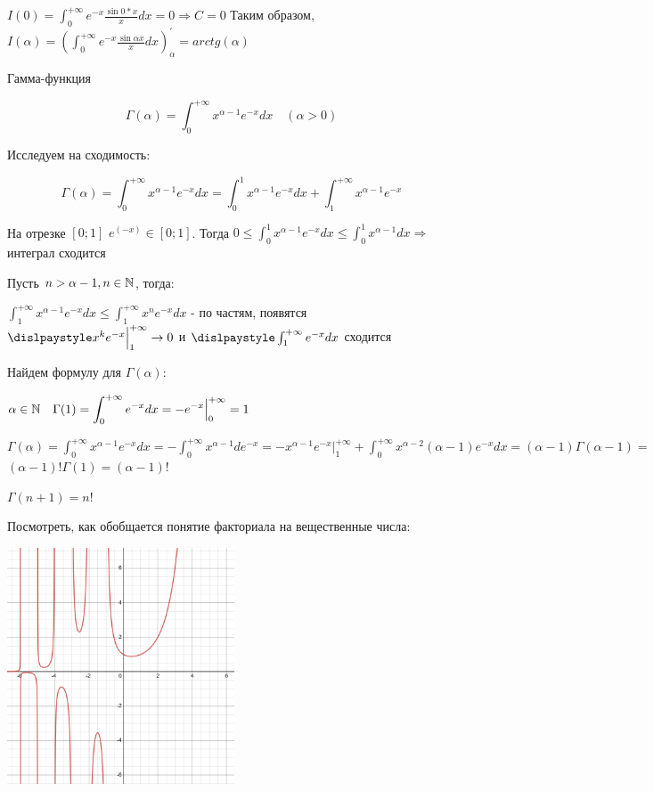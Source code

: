 \documentclass[12pt]{article}
\begin{document}
    $\displaystyle I(0) = \int^{+\infty}_0 e^{-x} \frac{\sin 0 * x}{x}dx = 0 \Longrightarrow C = 0$
    Таким образом, $\displaystyle I(\alpha) = \left(\int^{+\infty}_0 e^{-x} \frac{\sin\alpha x}{x} dx\right)^\prime_\alpha = arctg(\alpha)$

    \Ex Гамма-функция

    \[\Gamma(\alpha) = \int^{+\infty}_0 x^{\alpha - 1} e^{-x} dx \quad (\alpha > 0)\]

    Исследуем на сходимость:

    \[\Gamma(\alpha) = \int^{+\infty}_0 x^{\alpha - 1} e^{-x} dx = \int^{1}_0 x^{\alpha - 1} e^{-x} dx + \int^{+\infty}_1 x^{\alpha - 1} e^{-x}\]

    На отрезке $[0; 1]$ $e^(-x) \in [0;1]$.
    Тогда $\displaystyle 0 \leq \int^{1}_0 x^{\alpha - 1} e^{-x} dx \leq \int^{1}_0 x^{\alpha - 1} dx \Longrightarrow$ интеграл сходится

    Пусть $n > \alpha - 1, n \in \mathbb{N}$, тогда:

    $\displaystyle \int^{+\infty}_1 x^{\alpha - 1} e^{-x} dx \leq \int^{+\infty}_1 x^{n} e^{-x} dx$ - по частям, появятся $\dislpaystyle x^{k} e^{-x} \Big|^{+\infty}_1 \rightarrow 0$ и $\dislpaystyle \int^{+\infty}_1 e^{-x} dx$ сходится

    Найдем формулу для $\Gamma(\alpha)$:

    $\displaystyle \alpha \in \mathbb{N} \quad \Gamma(1) = \int^{+\infty}_0 e^{-x} dx = -e^{-x} \Big|^{+\infty}_{0} = 1$

    $\displaystyle \Gamma(\alpha) = \int^{+\infty}_0 x^{\alpha - 1} e^{-x} dx = -\int^{+\infty}_0 x^{\alpha - 1} de^{-x} = -x^{\alpha - 1}e^{-x} \Big|^{+\infty}_1 + \int^{+\infty}_0 x^{\alpha - 2} (\alpha - 1) e^{-x} dx = (\alpha - 1) \Gamma(\alpha - 1) = $
    $(\alpha - 1)! \Gamma(1) = (\alpha - 1)!$

    $\Gamma(n + 1) = n!$

    \Lab Посмотреть, как обобщается понятие факториала на вещественные числа:

    \includegraphics[height=70mm]{calculus/images/calculus_2024_02_28_1}
\end{document}
